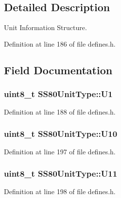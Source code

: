 \subsection{Detailed Description}
Unit Information Structure. 

Definition at line 186 of file defines.\+h.



\subsection{Field Documentation}
\subsubsection[{\texorpdfstring{U1}{U1}}]{\setlength{\rightskip}{0pt plus 5cm}uint8\+\_\+t S\+S80\+Unit\+Type\+::\+U1}\hypertarget{structSS80UnitType_ad7824d13f00e1e6893f57de54b3a2ac9}{}\label{structSS80UnitType_ad7824d13f00e1e6893f57de54b3a2ac9}


Definition at line 188 of file defines.\+h.

\subsubsection[{\texorpdfstring{U10}{U10}}]{\setlength{\rightskip}{0pt plus 5cm}uint8\+\_\+t S\+S80\+Unit\+Type\+::\+U10}\hypertarget{structSS80UnitType_a5fbd046709506b3f41c2df598a6373d6}{}\label{structSS80UnitType_a5fbd046709506b3f41c2df598a6373d6}


Definition at line 197 of file defines.\+h.

\subsubsection[{\texorpdfstring{U11}{U11}}]{\setlength{\rightskip}{0pt plus 5cm}uint8\+\_\+t S\+S80\+Unit\+Type\+::\+U11}\hypertarget{structSS80UnitType_aa7840672069613dfaea6b81b9c6d6d71}{}\label{structSS80UnitType_aa7840672069613dfaea6b81b9c6d6d71}


Definition at line 198 of file defines.\+h.

